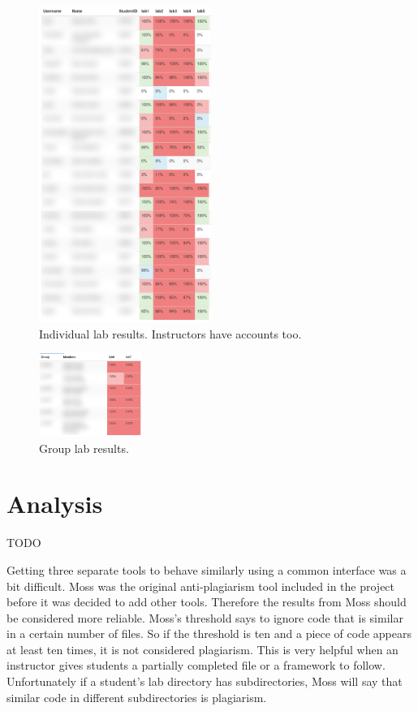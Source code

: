 \documentclass[10pt,journal,compsoc]{IEEEtran}
\begin{document}
		\begin{figure}[h!]
			\includegraphics[width=0.5\textwidth]{indlabresults.png}
			\caption{Individual lab results. Instructors have accounts too.}
			\label{fig:indlabresults}
		\end{figure}
		
		\begin{figure}[h!]
			\includegraphics[width=0.3\textwidth]{grouplabresults.png}
			\caption{Group lab results.}
			\label{fig:grouplabresults}
		\end{figure}
	
	\section{Analysis}
	TODO
	
	Getting three separate tools to behave similarly using a common interface was a bit difficult. Moss was the original anti-plagiarism tool included in the project before it was decided to add other tools. Therefore the results from Moss should be considered more reliable. Moss's threshold says to ignore code that is similar in a certain number of files. So if the threshold is ten and a piece of code appears at least ten times, it is not considered plagiarism. This is very helpful when an instructor gives students a partially completed file or a framework to follow. Unfortunately if a student's lab directory has subdirectories, Moss will say that similar code in different subdirectories is plagiarism.
	
\end{document}

